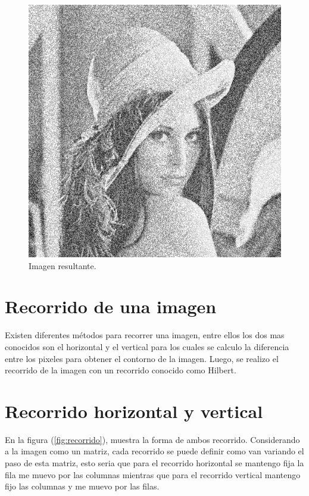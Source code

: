 \begin{figure}[H]
	\centering
	\includegraphics[scale=0.5]{imagenes/ruidoAleatorioBernuli.png}

	\caption{Imagen resultante.}
\end{figure}

\section{Recorrido de una imagen}

Existen diferentes métodos para recorrer una imagen, entre ellos los dos mas conocidos son el horizontal y el vertical para los cuales se calculo la diferencia entre los pixeles para obtener el contorno de la imagen. Luego, se realizo el recorrido de la imagen con un recorrido conocido como Hilbert. 

\section{Recorrido horizontal y vertical}


En la figura (\ref{fig:recorrido}), muestra la forma de ambos recorrido. Considerando a la imagen como un matriz, cada recorrido se puede definir como van variando el paso de esta matriz, esto seria que para el recorrido horizontal se mantengo fija la fila  me muevo por las columnas mientras que para el recorrido vertical mantengo fijo las columnas y me muevo por las filas. 

